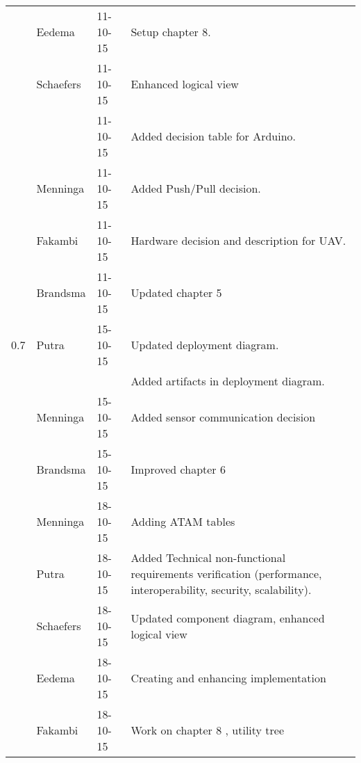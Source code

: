 \begin{longtable}{L{} L{} L{} L{}}
	                 & Eedema                & 11-10-15      & Setup chapter 8.                                                                                                                                                                                                           \\
	                 & Schaefers             & 11-10-15      & Enhanced logical view                                                                                                                                                                                                      \\
	                 &                       & 11-10-15      & Added decision table for Arduino.                                                                                                                                                                                          \\
	                 & Menninga              & 11-10-15      & Added Push/Pull decision.                                                                                                                                                                                                  \\
	                 & Fakambi               & 11-10-15      & Hardware decision and description for UAV.                                                                                                                                                                                 \\
	                 & Brandsma              & 11-10-15      & Updated chapter 5                                                                                                                                                                                                          \\
	\midrule
			
	0.7              & Putra                 & 15-10-15      & Updated deployment diagram. \\
	                 &                       &               & Added artifacts in deployment diagram. \\
                     & Menninga				 & 15-10-15      & Added sensor communication decision \\
                     & Brandsma				 & 15-10-15		 & Improved chapter 6 \\
	                 & Menninga				 & 18-10-15      & Adding ATAM tables \\
	                 & Putra                 & 18-10-15      & Added Technical non-functional requirements verification (performance, interoperability, security, scalability). \\
	                 & Schaefers			& 18-10-15      & Updated component diagram, enhanced logical view \\
	                 & Eedema				& 18-10-15		& Creating and enhancing implementation \\
	                 & Fakambi              & 18-10-15      & Work on chapter 8 , utility tree \\
	\bottomrule
\end{longtable}
